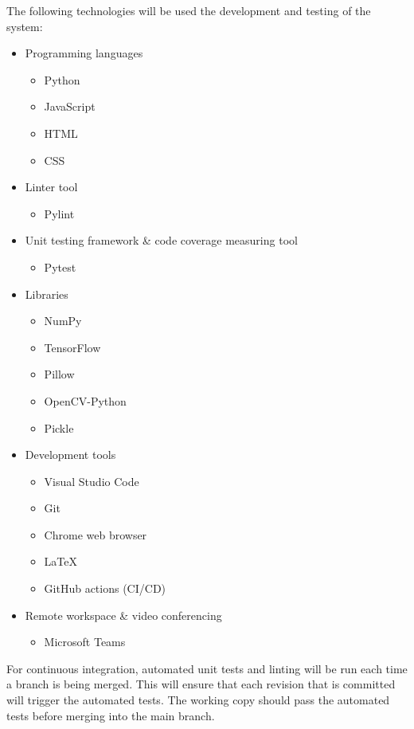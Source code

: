 \documentclass{article}
\begin{document}
The following technologies will be used the development and testing of the system:
\begin{itemize}
	\item Programming languages
	\begin{itemize}
		\item Python
		\item JavaScript
		\item HTML
		\item CSS
	\end{itemize}
	\item Linter tool
	\begin{itemize}
		\item Pylint
	\end{itemize}
	\item Unit testing framework \& code coverage measuring tool
	\begin{itemize}
		\item Pytest
	\end{itemize}
	\item Libraries
	\begin{itemize}
		\item NumPy
		\item TensorFlow
		\item Pillow
		\item OpenCV-Python
		\item Pickle
	\end{itemize}
	\item Development tools
	\begin{itemize}
		\item Visual Studio Code
		\item Git
		\item Chrome web browser
		\item \LaTeX
		\item GitHub actions (CI/CD)
	\end{itemize}
	\item Remote workspace \& video conferencing
	\begin{itemize}
		\item Microsoft Teams
	\end{itemize}
\end{itemize}

For continuous integration, automated unit tests and linting will be run each time a branch is being merged. This will ensure that each revision that is committed will trigger the automated tests. The working copy should pass the automated tests before merging into the main branch. 
\end{document}
